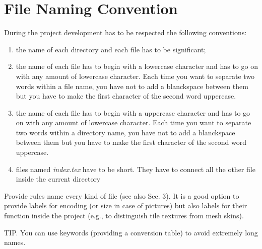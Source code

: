 \documentclass[12pt]{article}
\begin{document}
\section{File Naming Convention}
During the project development has to be respected the following conventions:
\begin{enumerate}
  \item the name of each directory and each file has to be significant;
  \item the name of each file has to begin with a lowercase character and has to go on with any amount of lowercase character. Each time you want to separate two words within a file name, you have not to add a blanckspace between them but you have to make the first character of the second word uppercase.
  \item the name of each file has to begin with a uppercase character and has to go on with any amount of lowercase character. Each time you want to separate two words within a directory name, you have not to add a blanckspace between them but you have to make the first character of the second word uppercase.
   \item files named \textit{index.tex} have to be short. They have to connect all the other file inside the current directory
\end{enumerate}


Provide rules name every kind of file (see also Sec. 3).
It is a good option to provide labels for encoding (or size in case of pictures) but also labels for their function inside the project (e.g., to distinguish tile textures from mesh skins).

TIP. You can use keywords (providing a conversion table) to avoid extremely long names.
\end{document}
